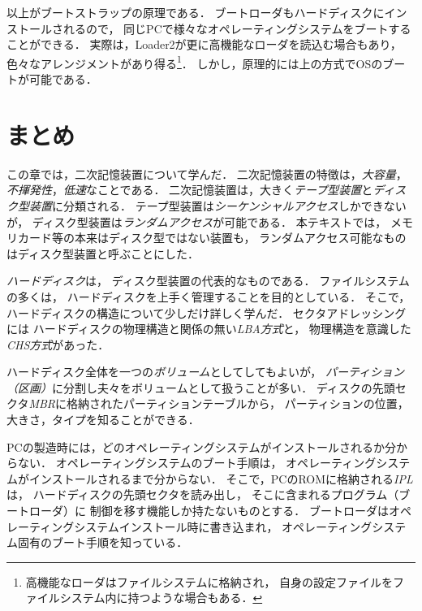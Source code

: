 以上がブートストラップの原理である．
ブートローダもハードディスクにインストールされるので，
同じPCで様々なオペレーティングシステムをブートすることができる．
実際は，Loader2が更に高機能なローダを読込む場合もあり，
色々なアレンジメントがあり得る\footnote{
高機能なローダはファイルシステムに格納され，
自身の設定ファイルをファイルシステム内に持つような場合もある．}．
しかし，原理的には上の方式でOSのブートが可能である．

\section{まとめ}
この章では，二次記憶装置について学んだ．
二次記憶装置の特徴は，\emph{大容量}，
\emph{不揮発性}，\emph{低速}なことである．
二次記憶装置は，大きく\emph{テープ型装置}と\emph{ディスク型装置}に分類される．
テープ型装置は\emph{シーケンシャルアクセス}しかできないが，
ディスク型装置は\emph{ランダムアクセス}が可能である．
本テキストでは，
メモリカード等の本来はディスク型ではない装置も，
ランダムアクセス可能なものはディスク型装置と呼ぶことにした．

\emph{ハードディスク}は，
ディスク型装置の代表的なものである．
ファイルシステムの多くは，
ハードディスクを上手く管理することを目的としている．
そこで，ハードディスクの構造について少しだけ詳しく学んだ．
セクタアドレッシングには
ハードディスクの物理構造と関係の無い\emph{LBA方式}と，
物理構造を意識した\emph{CHS方式}があった．

ハードディスク全体を一つの\emph{ボリューム}としてしてもよいが，
\emph{パーティション（区画）}に分割し夫々をボリュームとして扱うことが多い．
ディスクの先頭セクタ\emph{MBR}に格納されたパーティションテーブルから，
パーティションの位置，大きさ，タイプを知ることができる．

PCの製造時には，どのオペレーティングシステムがインストールされるか分からない．
オペレーティングシステムのブート手順は，
オペレーティングシステムがインストールされるまで分からない．
そこで，PCのROMに格納される\emph{IPL}は，
ハードディスクの先頭セクタを読み出し，
そこに含まれるプログラム（ブートローダ）に
制御を移す機能しか持たないものとする．
ブートローダはオペレーティングシステムインストール時に書き込まれ，
オペレーティングシステム固有のブート手順を知っている．


